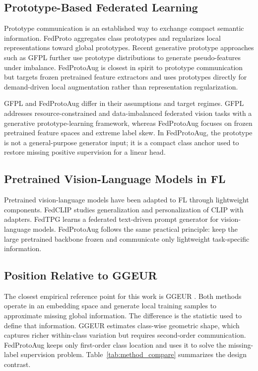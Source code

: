 ﻿\documentclass[conference]{IEEEtran}
\newcommand{\method}{FedProtoAug}
\newcommand{\clip}{CLIP}
\begin{document}
\subsection{Prototype-Based Federated Learning}
Prototype communication is an established way to exchange compact semantic information. FedProto \cite{tan2022fedproto} aggregates class prototypes and regularizes local representations toward global prototypes. Recent generative prototype approaches such as GFPL \cite{lu2026gfpl} further use prototype distributions to generate pseudo-features under imbalance. \method{} is closest in spirit to prototype communication but targets frozen pretrained feature extractors and uses prototypes directly for demand-driven local augmentation rather than representation regularization.

GFPL and \method{} differ in their assumptions and target regimes. GFPL addresses resource-constrained and data-imbalanced federated vision tasks with a generative prototype-learning framework, whereas \method{} focuses on frozen pretrained feature spaces and extreme label skew. In \method, the prototype is not a general-purpose generator input; it is a compact class anchor used to restore missing positive supervision for a linear head.

\subsection{Pretrained Vision-Language Models in FL}
Pretrained vision-language models have been adapted to FL through lightweight components. FedCLIP \cite{lu2023fedclip} studies generalization and personalization of \clip{} with adapters. FedTPG \cite{qiu2024fedtpg} learns a federated text-driven prompt generator for vision-language models. \method{} follows the same practical principle: keep the large pretrained backbone frozen and communicate only lightweight task-specific information.

\subsection{Position Relative to GGEUR}
The closest empirical reference point for this work is GGEUR \cite{ma2025ggeur}. Both methods operate in an embedding space and generate local training samples to approximate missing global information. The difference is the statistic used to define that information. GGEUR estimates class-wise geometric shape, which captures richer within-class variation but requires second-order communication. \method{} keeps only first-order class location and uses it to solve the missing-label supervision problem. Table~\ref{tab:method_compare} summarizes the design contrast.
\end{document}
